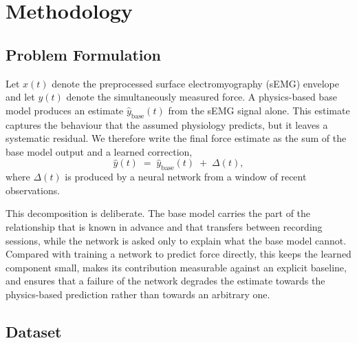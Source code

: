 %

\section{Methodology}
\label{sec:method}

\subsection{Problem Formulation}
\label{sec:formulation}

Let $x(t)$ denote the preprocessed surface electromyography (sEMG) envelope and
let $y(t)$ denote the simultaneously measured force. A physics-based base model
produces an estimate $\hat{y}_{\mathrm{base}}(t)$ from the sEMG signal alone.
This estimate captures the behaviour that the assumed physiology predicts, but
it leaves a systematic residual. We therefore write the final force estimate as
the sum of the base model output and a learned correction,
\begin{equation}
  \hat{y}(t) \;=\; \hat{y}_{\mathrm{base}}(t) \;+\; \Delta(t),
  \label{eq:decomposition}
\end{equation}
where $\Delta(t)$ is produced by a neural network from a window of recent
observations.

This decomposition is deliberate. The base model carries the part of the
relationship that is known in advance and that transfers between recording
sessions, while the network is asked only to explain what the base model cannot.
Compared with training a network to predict force directly, this keeps the
learned component small, makes its contribution measurable against an explicit
baseline, and ensures that a failure of the network degrades the estimate
towards the physics-based prediction rather than towards an arbitrary one.

\subsection{Dataset}
\label{sec:dataset}

